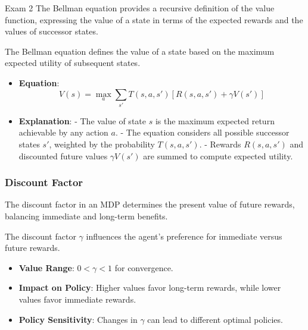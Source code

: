 \begin{examnotes}{Exam 2}
    The Bellman equation provides a recursive definition of the value function, expressing the value of a state in terms of the expected rewards and the values of successor states.
    
    \begin{highlight}
        The Bellman equation defines the value of a state based on the maximum expected utility of subsequent states.
        
        \begin{itemize}
            \item \textbf{Equation}: 
                \[
                V(s) = \max_{a} \sum_{s'} T(s, a, s') \left[ R(s, a, s') + \gamma V(s') \right]
                \]
            \item \textbf{Explanation}: 
                - The value of state \(s\) is the maximum expected return achievable by any action \(a\).
                - The equation considers all possible successor states \(s'\), weighted by the probability \(T(s, a, s')\).
                - Rewards \(R(s, a, s')\) and discounted future values \(\gamma V(s')\) are summed to compute expected utility.
        \end{itemize}
    \end{highlight}
    
    \subsubsection*{Discount Factor}
    
    The discount factor in an MDP determines the present value of future rewards, balancing immediate and long-term benefits.
    
    \begin{highlight}
        The discount factor $\gamma$ influences the agent's preference for immediate versus future rewards.
        
        \begin{itemize}
            \item \textbf{Value Range}: \(0 < \gamma < 1\) for convergence.
            \item \textbf{Impact on Policy}: Higher values favor long-term rewards, while lower values favor immediate rewards.
            \item \textbf{Policy Sensitivity}: Changes in $\gamma$ can lead to different optimal policies.
        \end{itemize}
    \end{highlight}
    

\end{examnotes}
